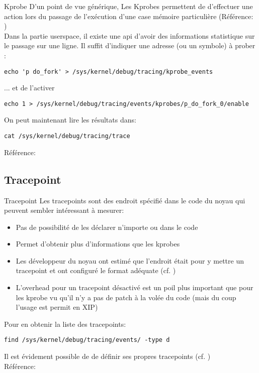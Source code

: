 \begin{frame}[fragile=singleslide]{Kprobe}
  D'un point  de vue générique, Les Kprobes  permettent de d'effectuer
  une  action  lors  du  passage  de l'exécution  d'une  case  mémoire
  particulière (Référence: )
  \\[2ex]
  Dans la partie userspace, il  existe une api d'avoir des informations
  statistique sur le passage sur  une ligne.  Il suffit d'indiquer une
  adresse (ou un symbole) à prober :
  \begin{lstlisting} 
echo 'p do_fork' > /sys/kernel/debug/tracing/kprobe_events 
  \end{lstlisting} 
  ... et de l'activer
  \begin{lstlisting} 
echo 1 > /sys/kernel/debug/tracing/events/kprobes/p_do_fork_0/enable             
  \end{lstlisting} 
  On peut maintenant lire les résultats dans:
  \begin{lstlisting} 
cat /sys/kernel/debug/tracing/trace
  \end{lstlisting} 
  Référence: 
\end{frame} 

\subsection{Tracepoint}

\begin{frame}[fragile=singleslide]{Tracepoint}
  Les tracepoints sont  des endroit spécifié dans le  code du noyau qui
  peuvent sembler intéressant à mesurer:
  \begin{itemize}  
  \item Pas de possibilité de les déclarer n'importe ou dans le code
  \item Permet d'obtenir plus d'informations que les kprobes
  \item Les développeur du noyau  ont estimé que l'endroit était pour y mettre un tracepoint et ont configuré le format adéquate (cf.
    )
  \item  L'overhead pour  un  tracepoint désactivé  est  un poil  plus
    important que  pour les kprobe  vu qu'il n'y  a pas de patch  à la
    volée du code (mais du coup l'usage est permit en XIP)
  \end{itemize} 
  Pour en obtenir la liste des tracepoints:
  \begin{lstlisting} 
find /sys/kernel/debug/tracing/events/ -type d
  \end{lstlisting} 
  Il  est évidement  possible  de de  définir  ses propres  tracepoints
  (cf. )
  \\[2ex]
  Référence: 
\end{frame} 

